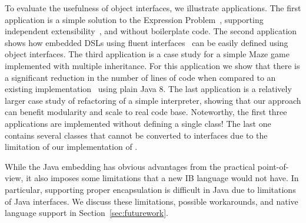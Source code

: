 
To evaluate the usefulness of object interfaces, we illustrate
\numOfCaseStudies {} 
applications. The first application is a simple 
solution to the Expression Problem~\cite{wadler98expression}, supporting independent 
extensibility~\cite{zenger05independentlyextensible}, and without boilerplate code. The second
application shows how embedded DSLs using fluent interfaces~\cite{fowler2005fluentinterface} 
can be easily defined using object interfaces. The third
application is a case study for a simple Maze game implemented with 
multiple inheritance. For this application we show that there is a
significant reduction in the number of lines of code when compared 
to an existing implementation~\cite{bono14} using plain Java 8. The last
application is a relatively larger case study of refactoring of a simple interpreter, showing that our
approach can benefit modularity and scale to real code base. Noteworthy, the first three applications are implemented 
without defining a single class! The last one contains several classes that cannot be 
converted to interfaces due to the limitation of our implementation of \mixin.

While the Java embedding has obvious advantages from the practical
point-of-view, it also imposes some limitations that a new IB language
would not have. In particular, supporting proper encapsulation is
difficult in Java due to limitations of Java interfaces. We discuss
these limitations, possible workarounds, and native language support in Section~\ref{sec:futurework}.

